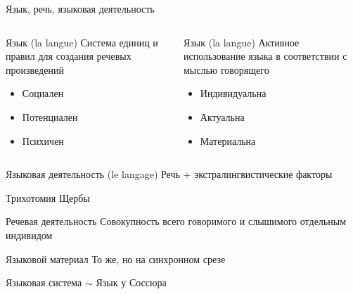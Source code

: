 \begin{frame}{Язык, речь, языковая деятельность}
    \begin{columns}
        \begin{block}{Язык (la langue)}
            Система единиц и правил для создания речевых произведений
            \begin{itemize}
                \item Социален
                \item Потенциален
                \item Психичен
            \end{itemize}
        \end{block}

        \begin{block}{Язык (la langue)}
            Активное использование языка в соответствии с мыслью говорящего
            \begin{itemize}
                \item Индивидуальна
                \item Актуальна
                \item Материальна
            \end{itemize}
        \end{block}
    \end{columns}

    \vfill

    \begin{block}{Языковая деятельность (le langage)}
        Речь $+$ экстралингвистические факторы
    \end{block}
\end{frame}

\begin{frame}{Трихотомия Щербы}
    \begin{block}{Речевая деятельность}
        Совокупность всего говоримого и слышимого отдельным индивидом
    \end{block}

    \begin{block}{Языковой материал}
        То же, но на синхронном срезе
    \end{block}

    \begin{block}{Языковая система}
        $\sim$ Язык у Соссюра
    \end{block}
\end{frame}

